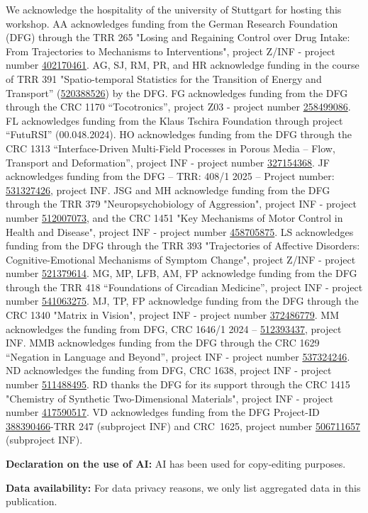 \documentclass{eceasst}
\newcommand{\geprislink}[1]{\href{https://gepris.dfg.de/gepris/projekt/#1?language=en}{#1}}
\newenvironment{aiuse}{%
  \par\vspace{11pt}%
  \noindent\textbf{Declaration on the use of AI:}\enspace}{%
  \par\vspace{11pt}}
\newenvironment{data}{%
  \par\vspace{11pt}%
  \noindent\textbf{Data availability:}\enspace}{%
  \par\vspace{11pt}}
\begin{document}
\begin{acknowledge}
We acknowledge the hospitality of the university of Stuttgart for hosting this workshop.
AA acknowledges funding from the German Research Foundation (DFG) through the TRR 265 "Losing and Regaining Control over Drug Intake: From Trajectories to Mechanisms to Interventions", project  Z/INF - project number \geprislink{402170461}.
AG, SJ, RM, PR, and HR acknowledge funding in the course of TRR 391 "Spatio-temporal Statistics for the Transition of Energy and Transport'' (\geprislink{520388526}) by the DFG.
FG acknowledges funding from the DFG through the CRC 1170 “Tocotronics”, project Z03 - project number \geprislink{258499086}.
FL acknowledges funding from the Klaus Tschira Foundation through project “FutuRSI” (00.048.2024).
HO acknowledges funding from the DFG through the CRC 1313 “Interface-Driven Multi-Field Processes in Porous Media – Flow, Transport and Deformation”, project INF - project number \geprislink{327154368}.
JF acknowledges funding from the DFG – TRR: 408/1 2025 – Project number: \geprislink{531327426}, project INF.
JSG and MH acknowledge funding from the DFG through the TRR 379 "Neuropsychobiology of Aggression", project INF - project number \geprislink{512007073}, and the CRC 1451 "Key Mechanisms of Motor Control in Health and Disease", project INF - project number \geprislink{458705875}.
LS acknowledges funding from the DFG through the TRR 393 "Trajectories of Affective Disorders: Cognitive-Emotional Mechanisms of Symptom Change", project  Z/INF - project number \geprislink{521379614}.
MG, MP, LFB, AM, FP acknowledge funding from the DFG through the TRR 418 ``Foundations of Circadian Medicine'', project INF - project number \geprislink{541063275}.
MJ, TP, FP acknowledge funding from the DFG through the CRC 1340 "Matrix in Vision", project INF - project number \geprislink{372486779}.
MM acknowledges the funding from DFG, CRC 1646/1 2024 -- \geprislink{512393437}, project INF.
MMB acknowledges funding from the DFG through the CRC 1629 ``Negation in Language and Beyond'', project INF - project number \geprislink{537324246}.
ND acknowledges the funding from DFG, CRC 1638, project INF - project number \geprislink{511488495}.
RD thanks the DFG for its support through the CRC 1415 "Chemistry of Synthetic Two-Dimensional Materials", project INF - project number \geprislink{417590517}.
VD acknowledges funding from the DFG Project-ID \geprislink{388390466}-TRR 247 (subproject INF) and CRC~1625, project number \geprislink{506711657} (subproject INF).

\end{acknowledge}

\begin{aiuse}
AI has been used for copy-editing purposes.
\end{aiuse}

\begin{data}
For data privacy reasons, we only list aggregated data in this publication.
\end{data}



\end{document}
